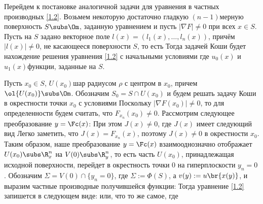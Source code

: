 \documentclass[a4paper,draft]{article}
\begin{document}
Перейдем к постановке аналогичной задачи для уравнения в частных производных \eqref{1.2}. Возьмем некоторую
достаточно гладкую $(n-1)$\д мерную поверхность $S\subs \Om$, заданную уравнением
и пусть $|\nabla F|\neq 0$ при всех $x\in S$. Пусть на $S$ задано векторное поле
$l(x)=(l_1(x),\dots,l_n(x))$, причём $|l(x)| \neq 0$, не касающееся поверхности $S$, то есть
Тогда задачей Коши будет нахождение решения уравнения \eqref{1.2} с начальными условиями
где $u_0(x)$ и $u_1(x)$\т функции, заданные на $S$.

Пусть $x_0\in S$, $U(x_0)$\т шар радиусом $\rho$ с центром в $x_0$, причем $\ol{U(x_0)}\subs\Om$.
Обозначим $S_0=S\cap U(x_0)$ и будем решать задачу Коши в окрестности точки $x_0$ с условиями
Поскольку $|\nabla F(x_0)|\neq 0$, то для определенности будем считать, что $F_{x_n}(x_0)\neq 0$. Рассмотрим следующее
преобразование $y=\Fc(x)$:
При этом $J(x)\neq 0$, где $J(x)$ имеет следующий вид
Легко заметить, что $J(x)=F_{x_n}(x)$, поэтому $J(x)\neq 0$ в
окрестности $x_0$. Таким образом, наше преобразование $y=\Fc(x)$ взаимо\д однозначно
отображает $U(x_0)\subs\R^n_x$ на $V(0)\subs\R^n_y$, то есть часть $U(x_0)$, принадлежащая
исходной поверхности, перейдет в окрестность точки $0$ на гиперплоскости $y_n=0$.
Обозначим $\Sigma=V(0)\cap\{y_n=0\}$, где $\Sigma:=\Phi(S)$, а $v(y):=u\br{x(y)}$,
и выразим частные производные получившейся функции:
Тогда уравнение \eqref{1.2} запишется в следующем виде:
или, что то же самое,
где
\end{document}
